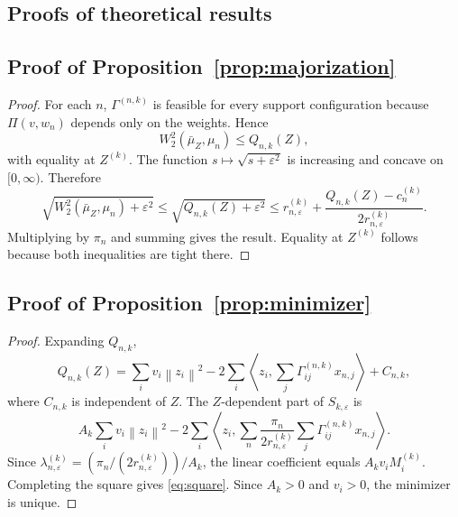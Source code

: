 \documentclass[pdflatex,sn-mathphys-ay]{sn-jnl}%
\theoremstyle{thmstyleone}%
\theoremstyle{thmstyletwo}%
\theoremstyle{thmstylethree}%
\newcommand{\eps}{\varepsilon}
\newcommand{\barmu}{\bar\mu}
\newcommand{\norm}[1]{\left\lVert #1\right\rVert}
\begin{document}






\begin{appendices}

\section{Proofs of theoretical results}\label{app:proof}
\subsection{Proof of Proposition~\ref{prop:majorization} }
\begin{proof}
For each \(n\), \(\Gamma^{(n,k)}\) is feasible for every support configuration because \(\Pi(v,w_n)\) depends only on the weights. Hence
\[
    W_2^2(\barmu_Z,\mu_n)\le Q_{n,k}(Z),
\]
with equality at \(Z^{(k)}\). The function \(s\mapsto\sqrt{s+\eps^2}\) is increasing and concave on \([0,\infty)\). Therefore
\[
\sqrt{W_2^2(\barmu_Z,\mu_n)+\eps^2}
\le
\sqrt{Q_{n,k}(Z)+\eps^2}
\le
r_{n,\eps}^{(k)}+\frac{Q_{n,k}(Z)-c_n^{(k)}}{2r_{n,\eps}^{(k)}}.
\]
Multiplying by \(\pi_n\) and summing gives the result. Equality at \(Z^{(k)}\) follows because both inequalities are tight there.
\end{proof}

\subsection{Proof of Proposition~\ref{prop:minimizer}}
\begin{proof}
Expanding \(Q_{n,k}\),
\[
Q_{n,k}(Z)=
\sum_i v_i\norm{z_i}^2
-2\sum_i\left\langle z_i,\sum_j\Gamma_{ij}^{(n,k)}x_{n,j}\right\rangle
+C_{n,k},
\]
where \(C_{n,k}\) is independent of \(Z\). The \(Z\)-dependent part of \(S_{k,\eps}\) is
\[
A_k\sum_i v_i\norm{z_i}^2
-
2\sum_i\left\langle z_i,
\sum_n\frac{\pi_n}{2r_{n,\eps}^{(k)}}\sum_j\Gamma_{ij}^{(n,k)}x_{n,j}
\right\rangle.
\]
Since \(\lambda_{n,\eps}^{(k)}=(\pi_n/(2r_{n,\eps}^{(k)}))/A_k\), the linear coefficient equals \(A_k v_iM_i^{(k)}\). Completing the square gives \eqref{eq:square}. Since \(A_k>0\) and \(v_i>0\), the minimizer is unique.
\end{proof}


\end{appendices}
\end{document}

